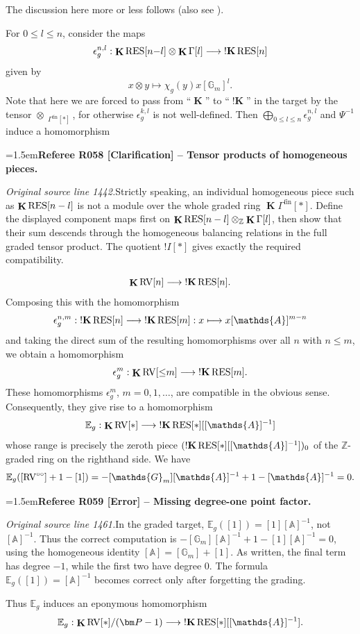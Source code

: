 \documentclass[12pt]{amsart}
\newcommand{\RefereeRemark}[4]{%
  \par\medskip\begingroup\normalfont\small\color{RefereePurple}%
  \emergencystretch=1.5em\noindent\textbf{Referee R#1 [#2] -- #3.}\par\nobreak\noindent #4\par
  \endgroup\medskip
}
\theoremstyle{plain}
\theoremstyle{definition}
\theoremstyle{remark}
\numberwithin{equation}{section}
\theoremstyle{plain}
\newcommand{\RV}{\textup{RV}}
\newcommand{\Z}{\mathds{Z}}
\newcommand{\A}{\mathds{A}}
\newcommand{\G}{\mathds{G}}
\newcommand{\0}{\emptyset}
\newcommand{\bb}[1]{\mathbb{#1}}
\newcommand{\fun}{\longrightarrow}
\newcommand{\efun}{\longmapsto}
\newcommand{\RES}{\textup{RES}}
\DeclareMathOperator{\gsk}{\mathbf{K}_+}
\DeclareMathOperator{\ggk}{\mathbf{K}}
\DeclareMathOperator{\sggk}{!\mathbf{K}}
\DeclareMathOperator{\fin}{fin}
\newcommand{\ccirc}{\circ \circ}
\begin{document}
The discussion here more or less follows \cite[\S~2.5]{hru:loe:lef} (also see \cite[Theorem~10.5]{hrushovski:kazhdan:integration:vf}).

For $0 \leq l \leq n$, consider the maps
\[
\epsilon^{n,l}_g : \ggk \RES[n{-}l] \otimes \ggk \Gamma[l] \fun \sggk \RES[n]
\]
given by
\begin{equation}\label{kill:gamma}
x \otimes y \efun \chi_g(y) x [\G_m]^l.
\end{equation}
Note that here we are forced to pass from ``${\ggk}$'' to ``$\sggk$'' in the target by the tensor $\otimes_{\gsk \Gamma^{\fin}[*]}$, for otherwise $\epsilon^{k,l}_g$ is not well-defined. Then $\bigoplus_{0 \leq l \leq n} \epsilon^{n,l}_g$ and $\Psi^{-1}$ induce a homomorphism

\RefereeRemark{058}{Clarification}{Tensor products of homogeneous pieces}{%
\textit{Original source line 1442.}\quad Strictly speaking, an individual homogeneous piece such as $\ggk\RES[n-l]$ is not a module over the whole graded ring $\ggk\Gamma^{\fin}[*]$. Define the displayed component maps first on $\ggk\RES[n-l]\otimes_{\mathbb Z}\ggk\Gamma[l]$, then show that their sum descends through the homogeneous balancing relations in the full graded tensor product. The quotient $!I[*]$ gives exactly the required compatibility.
}
\[
\ggk \RV[n] \fun \sggk \RES[n].
\]
Composing this with the homomorphism
\[
\epsilon^{n,m}_g : \sggk \RES[n]  \fun \sggk \RES[m] : x \efun x [\A]^{m-n}
\]
and taking the direct sum of the resulting homomorphisms over all $n$ with $n \leq m$, we obtain a homomorphism
\[
\epsilon^m_g : \ggk \RV[{\leq} m] \fun \sggk \RES[m].
\]
These homomorphisms $\epsilon^m_g$, $m = 0, 1, \ldots$, are compatible in the obvious sense. Consequently, they give rise to a homomorphism
\[
\bb E_g : \ggk \RV[*] \fun \sggk \RES[*][[\A]^{-1}]
\]
whose range is precisely the zeroth piece $(\sggk \RES[*][[\A]^{-1}])_0$ of the $\Z$-graded ring on the righthand side. We have
\begin{equation}\label{eg:isp:van}
\bb E_g([\RV^{\ccirc}] + 1 - [1]) = - [\G_m][\A]^{-1} + 1 - [\A]^{-1} = 0.
\end{equation}

\RefereeRemark{059}{Error}{Missing degree-one point factor}{%
\textit{Original source line 1461.}\quad In the graded target, $\mathbb E_g([1])=[1][\mathbb A]^{-1}$, not $[\mathbb A]^{-1}$. Thus the correct computation is $-[\mathbb G_m][\mathbb A]^{-1}+1-[1][\mathbb A]^{-1}=0$, using the homogeneous identity $[\mathbb A]=[\mathbb G_m]+[1]$. As written, the final term has degree $-1$, while the first two have degree $0$. The formula $\mathbb E_g([1])=[\mathbb A]^{-1}$ becomes correct only after forgetting the grading.
}
Thus $\bb E_g$ induces an eponymous homomorphism
\[
\bb E_g : \ggk \RV[*] / (\bm P - 1) \fun \sggk \RES[*][[\A]^{-1}].
\]
\end{document}
